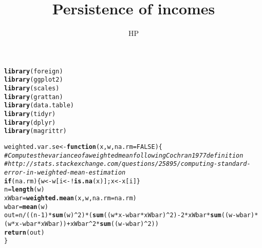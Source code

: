 \documentclass{grattanAlpha}\usepackage[]{graphicx}\usepackage[]{color}
\title{Persistence of incomes}
\author{HP}
\makeatletter
\newcommand{\hlnum}[1]{\textcolor[rgb]{0.686,0.059,0.569}{#1}}%
\newcommand{\hlcom}[1]{\textcolor[rgb]{0.678,0.584,0.686}{\textit{#1}}}%
\newcommand{\hlopt}[1]{\textcolor[rgb]{0,0,0}{#1}}%
\newcommand{\hlstd}[1]{\textcolor[rgb]{0.345,0.345,0.345}{#1}}%
\newcommand{\hlkwa}[1]{\textcolor[rgb]{0.161,0.373,0.58}{\textbf{#1}}}%
\newcommand{\hlkwb}[1]{\textcolor[rgb]{0.69,0.353,0.396}{#1}}%
\newcommand{\hlkwc}[1]{\textcolor[rgb]{0.333,0.667,0.333}{#1}}%
\newcommand{\hlkwd}[1]{\textcolor[rgb]{0.737,0.353,0.396}{\textbf{#1}}}%
\newenvironment{kframe}{%
 \def\at@end@of@kframe{}%
 \ifinner\ifhmode%
  \def\at@end@of@kframe{\end{minipage}}%
  \begin{minipage}{\columnwidth}%
 \fi\fi%
 \def\FrameCommand##1{\hskip\@totalleftmargin \hskip-\fboxsep
 \colorbox{shadecolor}{##1}\hskip-\fboxsep
     \hskip-\linewidth \hskip-\@totalleftmargin \hskip\columnwidth}%
 \MakeFramed {\advance\hsize-\width
   \@totalleftmargin\z@ \linewidth\hsize
   \@setminipage}}%
 {\par\unskip\endMakeFramed%
 \at@end@of@kframe}
\newenvironment{knitrout}{}{} %
\makeatother
\begin{document}
\contentspage




\begin{knitrout}
\color{fgcolor}\begin{kframe}
\begin{alltt}
\hlkwd{library}\hlstd{(foreign)}
\hlkwd{library}\hlstd{(ggplot2)}
\hlkwd{library}\hlstd{(scales)}
\hlkwd{library}\hlstd{(grattan)}
\hlkwd{library}\hlstd{(data.table)}
\hlkwd{library}\hlstd{(tidyr)}
\hlkwd{library}\hlstd{(dplyr)}
\hlkwd{library}\hlstd{(magrittr)}

\hlstd{weighted.var.se} \hlkwb{<-} \hlkwa{function}\hlstd{(}\hlkwc{x}\hlstd{,} \hlkwc{w}\hlstd{,} \hlkwc{na.rm}\hlstd{=}\hlnum{FALSE}\hlstd{)\{}
  \hlcom{# Computes the variance of a weighted mean following Cochran 1977 definition}
  \hlcom{# http://stats.stackexchange.com/questions/25895/computing-standard-error-in-weighted-mean-estimation}
  \hlkwa{if} \hlstd{(na.rm) \{ w} \hlkwb{<-} \hlstd{w[i} \hlkwb{<-} \hlopt{!}\hlkwd{is.na}\hlstd{(x)]; x} \hlkwb{<-} \hlstd{x[i] \}}
  \hlstd{n} \hlkwb{=} \hlkwd{length}\hlstd{(w)}
  \hlstd{xWbar} \hlkwb{=} \hlkwd{weighted.mean}\hlstd{(x,w,}\hlkwc{na.rm}\hlstd{=na.rm)}
  \hlstd{wbar} \hlkwb{=} \hlkwd{mean}\hlstd{(w)}
  \hlstd{out} \hlkwb{=} \hlstd{n}\hlopt{/}\hlstd{((n}\hlopt{-}\hlnum{1}\hlstd{)}\hlopt{*}\hlkwd{sum}\hlstd{(w)}\hlopt{^}\hlnum{2}\hlstd{)}\hlopt{*}\hlstd{(}\hlkwd{sum}\hlstd{((w}\hlopt{*}\hlstd{x}\hlopt{-}\hlstd{wbar}\hlopt{*}\hlstd{xWbar)}\hlopt{^}\hlnum{2}\hlstd{)}\hlopt{-}\hlnum{2}\hlopt{*}\hlstd{xWbar}\hlopt{*}\hlkwd{sum}\hlstd{((w}\hlopt{-}\hlstd{wbar)}\hlopt{*}\hlstd{(w}\hlopt{*}\hlstd{x}\hlopt{-}\hlstd{wbar}\hlopt{*}\hlstd{xWbar))}\hlopt{+}\hlstd{xWbar}\hlopt{^}\hlnum{2}\hlopt{*}\hlkwd{sum}\hlstd{((w}\hlopt{-}\hlstd{wbar)}\hlopt{^}\hlnum{2}\hlstd{))}
  \hlkwd{return}\hlstd{(out)}
\hlstd{\}}
\end{alltt}
\end{kframe}
\end{knitrout}
\end{document}
